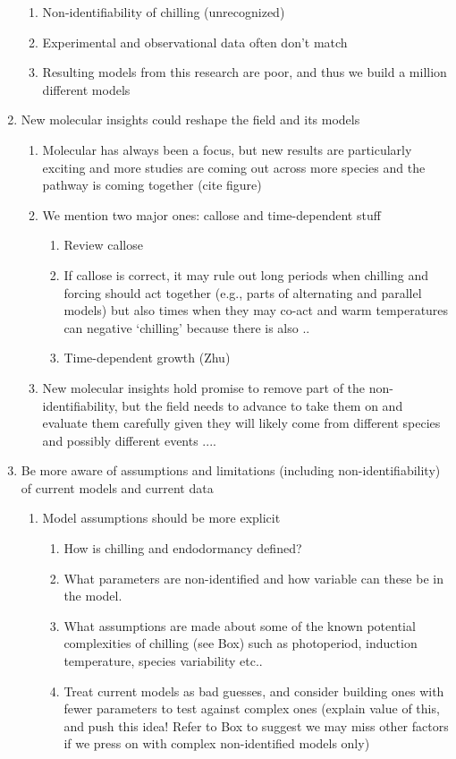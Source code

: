 \documentclass[11pt,letter]{article}
\begin{document}
\begin{enumerate}
\begin{enumerate}
\item Non-identifiability of chilling (unrecognized)
\item Experimental and observational data often don't match
\item Resulting models from this research are poor, and thus we build a million different models
\end{enumerate}
\item New molecular insights could reshape the field and its models 
\begin{enumerate}
\item Molecular has always been a focus, but new results are particularly exciting and more studies are coming out across more species and the pathway is coming together (cite figure)
\item We mention two major ones: callose and time-dependent stuff
\begin{enumerate}
\item Review callose
\item If callose is correct, it may rule out long periods when chilling and forcing should act together (e.g., parts of alternating and parallel models) but also times when they may co-act and warm temperatures can negative `chilling' because there is also .. 
\item Time-dependent growth (Zhu)
\end{enumerate}
\item New molecular insights hold promise to remove part of the non-identifiability, but the field needs to advance to take them on and evaluate them carefully given they will likely come from different species and possibly different events ....
\end{enumerate}
\item Be more aware of assumptions and limitations (including non-identifiability) of current models and current data
\begin{enumerate}
\item Model assumptions should be more explicit
\begin{enumerate}
\item How is chilling and endodormancy defined? 
\item What parameters are non-identified and how variable can these be in the model.
\item What assumptions are made about some of the known potential complexities of chilling (see Box) such as photoperiod, induction temperature, species variability etc..
\item Treat current models as bad guesses, and consider building ones with fewer parameters to test against complex ones (explain value of this, and push this idea! Refer to Box to suggest we may miss other factors if we press on with complex non-identified models only)

\end{enumerate}
\end{enumerate}
\end{enumerate}
\end{document}
